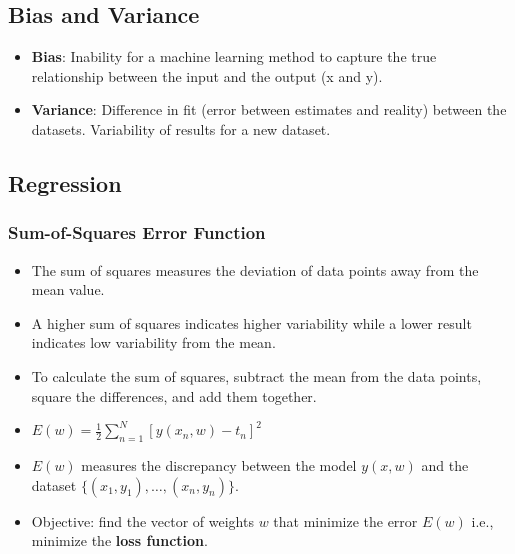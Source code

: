 \documentclass[8pt]{article}
\begin{document}
\subsection*{Bias and Variance}
\begin{itemize}
    \item \textbf{Bias}: Inability for a machine learning method to capture the true relationship between the input and the output (x and y).
    \item \textbf{Variance}: Difference in fit (error between estimates and reality) between the datasets. Variability of results for a new dataset.
\end{itemize}

\subsection*{Regression}
\subsubsection*{Sum-of-Squares Error Function}
\begin{itemize}
    \item The sum of squares measures the deviation of data points away from the mean value.
    \item A higher sum of squares indicates higher variability while a lower result indicates low variability from the mean.
    \item To calculate the sum of squares, subtract the mean from the data points, square the differences, and add them together.
    \item \( E(w) = \frac{1}{2} \sum_{n=1}^{N} [y(x_n, w) - t_n]^2 \)
    \item \( E(w) \) measures the discrepancy between the model \( y(x,w) \) and the dataset \( \{(x_1, y_1), \ldots, (x_n, y_n)\} \).
    \item Objective: find the vector of weights \( w \) that minimize the error \( E(w) \) i.e., minimize the \textbf{loss function}.
\end{itemize}
\end{document}
